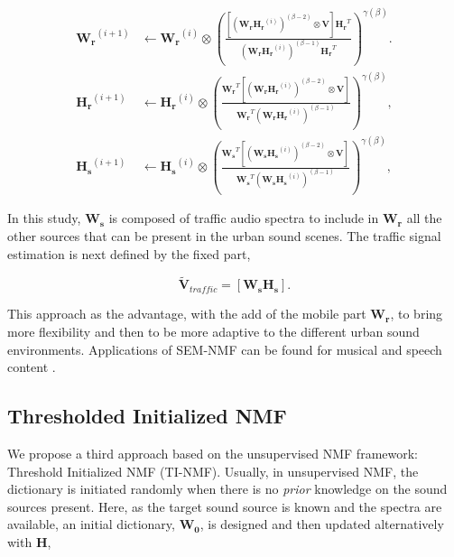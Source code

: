 \documentclass[review,5p,twocolumn,sort&compress,times]{elsarticle}
\begin{document}
{\scriptsize
\begin{subequations}\label{eq:WH-SSupdate}
\begin{align}
\mathbf{W_r}^{(i+1)} &\leftarrow \mathbf{W_r}^{(i)}\otimes\left(\frac{\left[\left(\mathbf{W_r H_r}^{(i)} \right)^{(\beta-2)}\otimes\mathbf{V} \right]\mathbf{H_r}^T}{\left(\mathbf{W_r H_r}^{(i)} \right)^{(\beta-1)}\mathbf{H_r}^T}\right)^{\gamma(\beta)}.\label{eq:W_r_SS}\\
\mathbf{H_r}^{(i+1)} &\leftarrow \mathbf{H_r}^{(i)}\otimes\left(\frac{\mathbf{W_r}^T \left[\left(\mathbf{W_r H_r}^{(i)} \right)^{(\beta-2)}\otimes\mathbf{V} \right]}{\mathbf{W_r}^T \left(\mathbf{W_r H_r}^{(i)} \right)^{(\beta-1)}}\right)^{\gamma(\beta)},\label{eq:H_r_SS}\\
\mathbf{H_s}^{(i+1)} &\leftarrow \mathbf{H_s}^{(i)}\otimes\left(\frac{\mathbf{W_s}^T \left[\left(\mathbf{W_s H_s}^{(i)} \right)^{(\beta-2)}\otimes\mathbf{V} \right]}{\mathbf{W_s}^T \left(\mathbf{W_s H_s}^{(i)} \right)^{(\beta-1)}}\right)^{\gamma(\beta)},\label{eq:H_s_SS}
\end{align}
\end{subequations}}

In this study, $\mathbf{W_s}$ is composed of traffic audio spectra to include in $\mathbf{W_r}$ all the other sources that can be present in the urban sound scenes. The traffic signal estimation is next defined by the fixed part, 

\begin{equation}\label{eq:separationExtraction_SS}
\mathbf{\tilde{V}}_{traffic} = \left[ \mathbf{W_s H_s} \right].
\end{equation}

This approach as the advantage, with the add of the mobile part $\mathbf{W_r}$, to bring more flexibility and then to be more adaptive to the different urban sound environments. Applications of SEM-NMF can be found for musical \cite{weninger2012supervised, kitamura_music_2014} and speech content \cite{joder2012real, mysore2011non}.

\subsection{Thresholded Initialized NMF}\label{part:NMF_TI}

We propose a third approach based on the unsupervised NMF framework: Threshold Initialized NMF (TI-NMF). Usually, in unsupervised NMF, the dictionary is initiated randomly when there is no \textit{prior} knowledge on the sound sources present. Here, as the target sound source is known and the spectra are available, an initial dictionary, $\mathbf{W_0}$, is designed and then updated alternatively with $\mathbf{H}$, 
\end{document}
